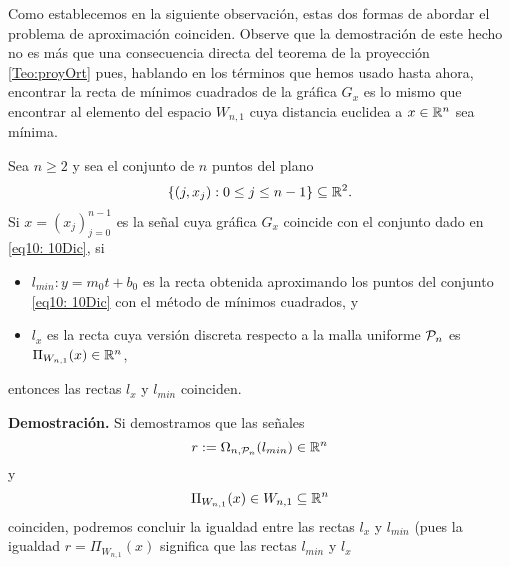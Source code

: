 \noindent Como establecemos en la siguiente observación, estas
dos formas de abordar el problema de aproximación
coinciden. Observe que la demostración de este hecho 
no es más que una consecuencia directa del 
teorema de la proyección \ref{Teo:proyOrt}
pues, hablando en los términos que hemos
usado hasta ahora, encontrar la recta de mínimos
cuadrados de la 
gráfica $G_{x}$ es lo mismo que encontrar al elemento
del espacio $W_{n,1}$ cuya distancia euclidea a $x \in \mathbb{R}^{n}$
sea mínima.


\begin{prop}
\label{prop: discretizacion recta minimos cuadrados}
Sea $n \geq 2$ y sea el conjunto de $n$ puntos del plano
\begin{equation}
\label{eq10: 10Dic}
\{(j, x_{j}): 0 \leq j \leq n-1 \}
\subseteq \mathbb{R}^{2}.
\end{equation}
Si $x=(x_{j})_{j=0}^{n-1}$ es la señal cuya
gráfica $G_{x}$ coincide con el conjunto dado
en \eqref{eq10: 10Dic}, si
\begin{itemize}
\item $l_{min}: y= m_{0}t+ b_{0}$ es la recta obtenida 
aproximando los puntos del conjunto \eqref{eq10: 10Dic}
con el método de mínimos cuadrados, y

\item $l_{x}$ es la recta cuya versión discreta 
respecto a la malla uniforme $\mathcal{P}_{n}$
es $\Pi_{W_{n,1}}(x) \in \mathbb{R}^{n}$, 

\end{itemize} 
entonces las rectas $l_{x}$ y $l_{min}$ coinciden.
\end{prop}
\noindent 
\textbf{Demostración.}
Si demostramos que las señales
\[
r:= \Omega_{n, \mathcal{P}_{n}}(l_{min}) \in \mathbb{R}^{n}
\]
y
\[
\Pi_{W_{n,1}}(x) \in W_{n,1} \subseteq \mathbb{R}^{n}
\]
coinciden, podremos concluir la 
igualdad entre las rectas $l_{x}$ y $l_{min}$
(pues la igualdad $r= \Pi_{W_{n,1}}(x)$
significa que las rectas $l_{min}$ y $l_{x}$
